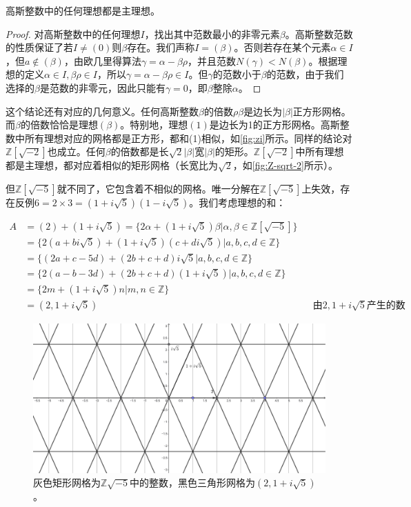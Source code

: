 \documentclass[b5paper]{ctexart}
\begin{document}
\begin{proposition}
高斯整数中的任何理想都是主理想。
\end{proposition}

\begin{proof}
对高斯整数中的任何理想$I$，找出其中范数最小的非零元素$\beta$。高斯整数范数的性质保证了若$I \ne (0)$则$\beta$存在。我们声称$I = (\beta)$。否则若存在某个元素$\alpha \in I$，但$a \notin (\beta)$，由欧几里得算法$\gamma = \alpha - \beta \rho$，并且范数$N(\gamma) < N(\beta)$。根据理想的定义$\alpha \in I, \beta \rho \in I$，所以$\gamma = \alpha - \beta \rho \in I$。但$\gamma$的范数小于$\beta$的范数，由于我们选择的$\beta$是范数的非零元，因此只能有$\gamma = 0$，即$\beta$整除$\alpha$。
\end{proof}

这个结论还有对应的几何意义。任何高斯整数$\beta$的倍数$\rho \beta$是边长为$|\beta|$正方形网格。而$\beta$的倍数恰恰是理想$(\beta)$。特别地，理想$(1)$是边长为1的正方形网格。高斯整数中所有理想对应的网格都是正方形，都和(1)相似，如\cref{fig:zi}所示。同样的结论对$\mathbb{Z}[\sqrt{-2}]$也成立。任何$\beta$的倍数都是长$\sqrt{2}|\beta|$宽$|\beta|$的矩形。$\mathbb{Z}[\sqrt{-2}]$中所有理想都是主理想，都对应着相似的矩形网格（长宽比为$\sqrt{2}$，如\cref{fig:Z-sqrt-2}所示）。

但$\mathbb{Z}[\sqrt{-5}]$就不同了，它包含着不相似的网格。唯一分解在$\mathbb{Z}[\sqrt{-5}]$上失效，存在反例$6 = 2 \times 3 = (1 + i\sqrt{5})(1 - i\sqrt{5})$。我们考虑理想的和：

\begin{align*}
A &= (2) + (1 + i\sqrt{5}) = \{2\alpha + (1 + i\sqrt{5})\beta | \alpha, \beta \in \mathbb{Z}[\sqrt{-5}]\} \\
  &= \{2(a + bi\sqrt{5}) + (1 + i\sqrt{5})(c + di\sqrt{5}) | a, b, c, d \in \mathbb{Z}\} \\
  &= \{(2a + c - 5d) + (2b + c + d)i\sqrt{5} | a, b, c, d \in \mathbb{Z} \} \\
  &= \{2(a - b - 3d) + (2b + c + d)(1 + i\sqrt{5}) | a, b, c, d \in \mathbb{Z} \} \\
  &= \{2m + (1 + i\sqrt{5})n | m, n \in \mathbb{Z} \} \\
  &= (2, 1 + i\sqrt{5}) && \text{由}2, 1+ i\sqrt{5}\text{产生的数}
\end{align*}

\begin{figure}[htbp]
 \centering
 \includegraphics[scale=0.3]{img/ideal-sum}
 \caption{灰色矩形网格为$\mathbb{Z}{\sqrt{-5}}$中的整数，黑色三角形网格为$(2, 1 + i\sqrt{5})$。}
 \label{fig:ideal-sum}
\end{figure}
\end{document}
